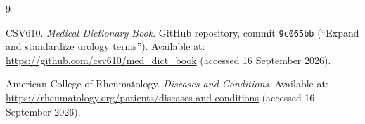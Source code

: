 \begin{thebibliography}{9}

CSV610. \textit{Medical Dictionary Book}. GitHub repository,
commit \texttt{9c065bb} (``Expand and standardize urology terms'').
Available at: \url{https://github.com/csv610/med_dict_book}
(accessed 16 September 2026).

American College of Rheumatology. \textit{Diseases and Conditions}.
Available at: \url{https://rheumatology.org/patients/diseases-and-conditions}
(accessed 16 September 2026).

\end{thebibliography}
